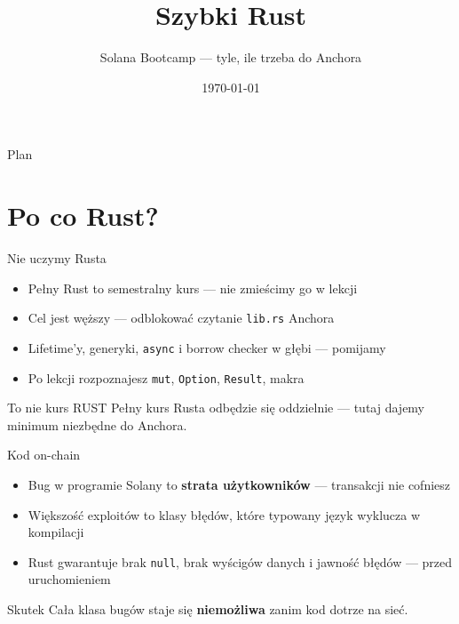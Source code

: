 

\usepackage[utf8]{inputenc}
\usepackage[T1]{fontenc}

\title{Szybki Rust}
\subtitle{Solana Bootcamp --- tyle, ile trzeba do Anchora}
\author{}
\date{\today}



\maketitleframe

\begin{frame}{Plan}
  \tableofcontents
\end{frame}

\section{Po co Rust?}

\begin{frame}{Nie uczymy Rusta}
  \begin{itemize}
    \item Pełny Rust to semestralny kurs --- nie zmieścimy go w lekcji
    \item Cel jest węższy --- odblokować czytanie \texttt{lib.rs} Anchora
    \item Lifetime'y, generyki, \texttt{async} i borrow checker w głębi --- pomijamy
    \item Po lekcji rozpoznajesz \texttt{mut}, \texttt{Option}, \texttt{Result}, makra
  \end{itemize}
  \vspace{0.25cm}
  \begin{alertblock}{To nie kurs RUST}
    Pełny kurs Rusta odbędzie się oddzielnie --- tutaj dajemy minimum
    niezbędne do Anchora.
  \end{alertblock}
\end{frame}

\begin{frame}{Kod on-chain}
  \begin{itemize}
    \item Bug w programie Solany to \textbf{strata użytkowników} --- transakcji nie cofniesz
    \item Większość exploitów to klasy błędów, które typowany język wyklucza w kompilacji
    \item Rust gwarantuje brak \texttt{null}, brak wyścigów danych i jawność błędów --- przed uruchomieniem
  \end{itemize}
  \vspace{0.3cm}
  \begin{alertblock}{Skutek}
    Cała klasa bugów staje się \textbf{niemożliwa} zanim kod dotrze na sieć.
  \end{alertblock}
\end{frame}

